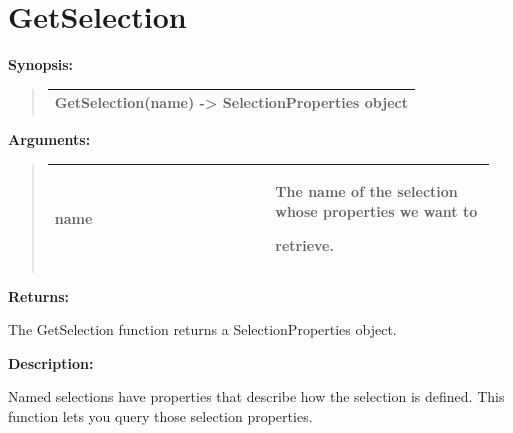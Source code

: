 \documentclass[letterpaper,10pt,english]{sphinxmanual}
\begin{document}
\section{GetSelection}
\label{functions:getselection}
\begin{DUlineblock}{0em}
\item[] \textbf{Synopsis:}
\end{DUlineblock}
\begin{quote}

\begin{tabulary}{\linewidth}{|L|}
\hline

GetSelection(name) -\textgreater{} SelectionProperties object
\\
\hline\end{tabulary}

\end{quote}

\begin{DUlineblock}{0em}
\item[] 
\item[] \textbf{Arguments:}
\end{DUlineblock}
\begin{quote}

\begin{tabular}{|p{0.475\linewidth}|p{0.475\linewidth}|}
\hline

name
 & 
\begin{DUlineblock}{0em}
\item[] The name of the selection whose properties we want to
\item[] retrieve.
\end{DUlineblock}
\\
\hline\end{tabular}

\end{quote}

\begin{DUlineblock}{0em}
\item[] 
\item[] \textbf{Returns:}
\item[] The GetSelection function returns a SelectionProperties object.
\item[] 
\item[] \textbf{Description:}
\item[] Named selections have properties that describe how the selection is defined.
This function lets you query those selection properties.
\end{DUlineblock}
\end{document}

